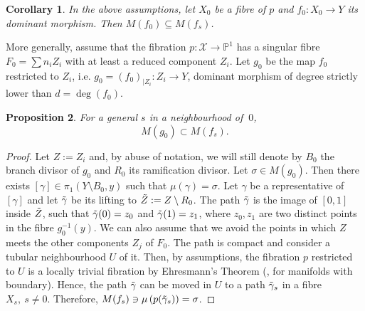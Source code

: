 \documentclass[12pt,a4paper,twoside,leqno,noamsfonts]{amsart}
\newtheorem{cor}{Corollary}[section]
\newtheorem{prop}[cor]{Proposition}
\theoremstyle{definition}
\newcommand{\bP}{\mathbb{P}}
\newcommand{\cX}{\mathcal{X}}
\begin{document}
\begin{cor}
In the above assumptions, let $X_0$ be a fibre of $p$ and $f_0: X_0 \to Y$ its dominant morphism. Then $M(f_0) \subseteq M(f_s)$.
\end{cor}

More generally, assume that the fibration $p:\cX \to \bP^1$ has a singular fibre $F_0=\sum n_i Z_i$ with at least a reduced component $Z_i$. 
Let $g_0$ be the map $f_0$ restricted to $Z_i$, i.e. $g_0 = (f_0)_{|Z_i}:Z_i \to Y$, dominant morphism of degree strictly lower than $d=\deg(f_0)$. 

\begin{prop}\label{redcomponent}
For a general $s$ in a neighbourhood of $\ 0$,
$$M(g_0) \subset M(f_s).$$
\end{prop}
\begin{proof}
Let $Z:=Z_i$ and, by abuse of notation, we will still denote by $B_0$ the branch divisor of $g_0$ and $R_0$ its ramification divisor. Let $\sigma \in M(g_0)$. Then there exists $[\gamma] \in \pi_1(Y \setminus B_0,y)$ such that $\mu (\gamma)=\sigma$. Let $\gamma$ be a representative of $[\gamma]$ and let $\Tilde{\gamma}$ be its lifting to $\Tilde{Z}:=Z\setminus R_0$. 
The path $\Tilde{\gamma}$ is the image of $[0,1]$ inside $\Tilde{Z}$, such that $\Tilde{\gamma}(0)=z_0$ and $\Tilde{\gamma}(1)=z_1$, where $z_0,z_1$ are two distinct points in the fibre $g_0^{-1}(y)$. We can also assume that we avoid the points in which $Z$ meets the other components $Z_j$ of $F_0$.
The path is compact and consider a tubular neighbourhood $U$ of it. Then, by assumptions, the fibration $p$ restricted to $U$ is a locally trivial fibration by Ehresmann's Theorem (\cite[Lemma 4.2]{Catanese}, \cite[Sec 4]{Massey} for manifolds with boundary). Hence, the path $\Tilde{\gamma}$ can be moved in $U$ to a path $\Tilde{\gamma}_s$ in a fibre $X_s,\ s \neq 0$. 
Therefore, $M(f_s)\owns\mu\left(p(\Tilde{\gamma}_s)\right)= \sigma$.  
\end{proof}
\end{document}
